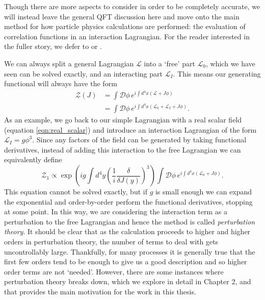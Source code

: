 Though there are more aspects to consider in order to be completely accurate, we will instead leave the general QFT discussion here and move onto the main method for how particle physics calculations are performed: the evaluation of correlation functions in an interaction Lagrangian. For the reader interested in the fuller story, we defer to \cite{Peskin1995} or \cite{Srednicki2007}. 

We can always split a general Lagrangian $\mathscr{L}$ into a `free' part $\mathscr{L}_0$, which we have seen can be solved exactly, and an interacting part $\mathscr{L}_I$.  This means our generating functional will always have the form
\begin{equation}
\begin{split}
\mathcal{Z}(J) &= \int \mathcal{D} \phi \hspace{2pt} e^{i \int d^4 x (\mathscr{L} + J \phi)} \\
&= \int \mathcal{D} \phi \hspace{2pt} e^{i \int d^4 x (\mathscr{L}_0 + \mathscr{L}_I + J \phi)}.
\end{split}
\end{equation}
As an example, we go back to our simple Lagrangian with a real scalar field (equation \ref{eqn:real_scalar}) and introduce an interaction Lagrangian of the form $\mathscr{L}_I = g \phi^3$. Since any factors of the field can be generated by taking functional derivatives, instead of adding this interaction to the free Lagrangian we can equivalently define
\begin{equation}
\mathcal{Z}_1 \propto \exp \left( i g \int d^4 y \left(\frac{1}{i} \frac{\delta}{\delta J(y)} \right)^3 \right) \int \mathcal{D} \phi \hspace{2pt} e^{i \int d^4 x (\mathscr{L}_0 + J \phi)}.
\end{equation}
This equation cannot be solved exactly, but if $g$ is small enough we can expand the exponential and order-by-order perform the functional derivatives, stopping at some point. In this way, we are considering the interaction term as a perturbation to the free Lagrangian and hence the method is called \emph{perturbation theory}. It should be clear that as the calculation proceeds to higher and higher orders in perturbation theory, the number of terms to deal with gets uncontrollably large. Thankfully, for many processes it is generally true that the first few orders tend to be enough to give us a good description and so higher order terms are not `needed'. However, there are some instances where perturbation theory breaks down, which we explore in detail in Chapter 2, and that provides the main motivation for the work in this thesis. 


